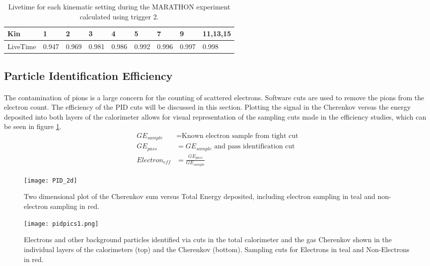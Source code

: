 \begin{table}[]
	\centering
	\caption{Livetime for each kinematic setting during the MARATHON experiment calculated using trigger 2.  }
\label{LTtable}
	\begin{tabular}{|l|l|l|l|l|l|l|l|l|}
		\hline
		Kin      & 1 & 2 & 3 & 4 & 5 & 7 & 9 & 11,13,15 \\ \hline
		LiveTime & 0.947 & 0.969 & 0.981 & 0.986 & 0.992 & 0.996 & 0.997 & 0.998\\ \hline
	\end{tabular}

\end{table}
  

\subsection{Particle Identification Efficiency}\label{ss:PID}
\paragraph{} The contamination of pions is a large concern for the counting of scattered electrons. Software cuts are used to remove the pions from the electron count. The efficiency of the PID cuts will be discussed in this section. Plotting the signal in the Cherenkov versus the energy deposited into both layers of the calorimeter allows for visual representation of the sampling cuts made in the efficiency studies, which can be seen in figure \ref{elesample}. 
\begin{equation}\label{effequ}
\begin{split}
GE_{sample} & = \textrm{Known electron sample from tight cut}  \\
GE_{pass} & = \textrm{$GE_{sample}$ and pass identification cut} \\
Electron_{eff}  & = \frac{ GE_{pass} } { GE_{sample} } 
\end{split}
\end{equation}
\begin{figure}[t]
	\centering

	\texttt{[image: PID\_2d]}
	\caption{Two dimensional plot of the Cherenkov sum versus Total Energy deposited, including electron sampling in teal and non-electron sampling in red. }
	\label{elesample}
\end{figure}

\begin{figure}[t]%
	{\centering
	\hspace*{2cm}
	\texttt{[image: pidpics1.png]}}
			\caption{Electrons and other background particles identified via cuts in the total calorimeter and the gas Cherenkov shown in the individual layers of the calorimeters (top) and the Cherenkov (bottom). Sampling cuts for Electrons in teal and Non-Electrons in red.}%
	\label{sampling}%
\end{figure}


